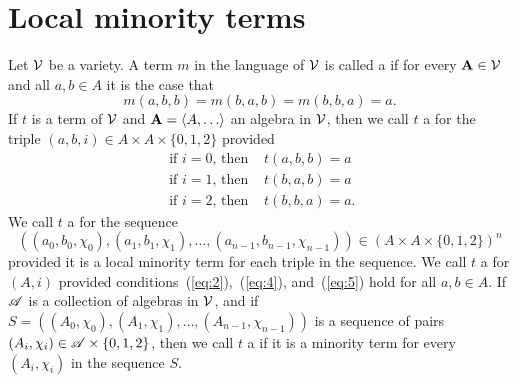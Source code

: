 








































\section{Local minority terms}
Let $\mathcal{V}$ be a variety.  A term $m$ in the language of $\mathcal{V}$
is called a  if for every $\mathbf{A} \in \mathcal{V}$ and
all $a, b \in A$ it is the case that 
\[
m(a,b,b) =m(b,a,b) = m(b,b,a) = a.
\]
If $t$ is a term of $\mathcal{V}$ and $\bA = \<A, \dots\>$ an algebra in $\mathcal{V}$, 
then we call $t$ a  for the triple
$(a,b,i) \in A\times A \times \{0,1,2\}$ provided
\begin{align}
\text{ if $i=0$, then } & t(a, b, b)= a\label{eq:2}\\
\text{ if $i=1$, then } & t(b,a,b) = a\label{eq:4}\\
\text{ if $i=2$, then } & t(b,b,a) = a\label{eq:5}. 
\end{align}
We call $t$ a
 for the sequence
\[
((a_0, b_0, \chi_0), (a_1, b_1, \chi_1), \dots, (a_{n-1}, b_{n-1}, \chi_{n-1}))
\in (A\times A \times \{0,1,2\})^n\]
provided it is a local minority term for each triple in the sequence.
We call $t$ a  for 
$(A,i)$ provided conditions~(\ref{eq:2}),~(\ref{eq:4}), and~(\ref{eq:5}) hold
for all $a, b \in A$.
If $\mathscr{A}$ is a collection of algebras in $\mathcal{V}$, and if
$S = ((A_0, \chi_0), (A_1, \chi_1), \dots, (A_{n-1}, \chi_{n-1}))$
is a sequence of pairs $(A_i, \chi_i) \in \mathscr{A} \times \{0,1,2\}$, then
we call $t$ a  if it is a
\glocal minority term for every $(A_i, \chi_i)$ in the sequence
$S$.

